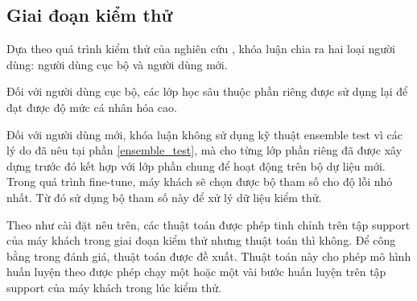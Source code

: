 \subsection{Giai đoạn kiểm thử}

Dựa theo quá trình kiểm thử của nghiên cứu \cite{liang2020think}, khóa luận chia ra hai loại người dùng: người dùng cục bộ và người dùng mới.

Đối với người dùng cục bộ, các lớp học sâu thuộc phần riêng được sử dụng lại để đạt được độ mức cá nhân hóa cao.

Đối với người dùng mới, khóa luận không sử dụng kỹ thuật ensemble test vì các lý do đã nêu tại phần \ref{ensemble_test}, mà cho từng lớp phần riêng đã được xây dựng trước đó kết hợp với lớp phần chung để hoạt động trên bộ dự liệu mới. Trong quá trình fine-tune, máy khách sẽ chọn được bộ tham số cho độ lỗi nhỏ nhất. Từ đó sử dụng bộ tham số này để xử lý dữ liệu kiểm thử.

Theo như cài đặt nêu trên, các thuật toán  được phép tinh chỉnh trên tập support của máy khách trong giai đoạn kiểm thử nhưng thuật toán  thì không. Để công bằng trong đánh giá, thuật toán  được đề xuất. Thuật toán này cho phép mô hình huấn luyện theo  được phép chạy một hoặc một vài bước huấn luyện trên tập support của máy khách trong lúc kiểm thử.
